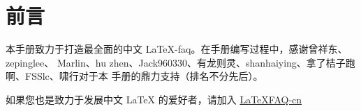 \section*{前言}
本手册致力于打造最全面的中文 \LaTeX{}-faq。在手册编写过程中，感谢曾祥东、zepinglee、
Marlin、hu zhen、Jack960330、有龙则灵、shanhaiying、拿了桔子跑啊、FSSlc、啸行对于本
手册的鼎力支持（排名不分先后）。

如果您也是致力于发展中文 \LaTeX{} 的爱好者，请加入 \href{https://github.com/latexstudio/LaTeXFAQ-cn}{LaTeXFAQ-cn}
\clearpage